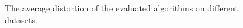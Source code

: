 \begin{figure}
{  }
  \newline \newline
  \label{fig:results}
  \caption{The average distortion of the evaluated algorithms on different datasets.}
\end{figure}




